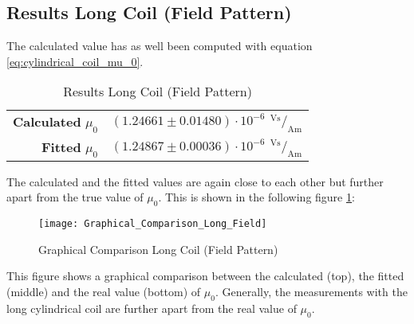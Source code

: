 \subsection{Results Long Coil (Field Pattern)}
\label{subsec:Results_Long_Coil_Field}
The calculated value has as well been computed with equation \ref{eq:cylindrical_coil_mu_0}.
\begin{table}[H]
	\centering
	\renewcommand{\arraystretch}{1.3}
	\begin{tabular}{r l}
		\hline
		\textbf{Calculated} $\mu_0$ & $(1.24661\pm0.01480)\cdot10^{-6}\ \,^\text{Vs}\!/_\text{Am}$ \\
		\textbf{Fitted} $\mu_0$ & $(1.24867\pm0.00036)\cdot10^{-6}\ \,^\text{Vs}\!/_\text{Am}$ \\ \hline
	\end{tabular}
	\caption{Results Long Coil (Field Pattern)}
	\label{tab:Results_Long_Coil_Field}
\end{table}
The calculated and the fitted values are again close to each other but further apart from the true value of $\mu_0$. This is shown in the following figure \ref{fig:Graphical_Comparison_Long_Field}:
\begin{figure}[H]
	\centering
	\texttt{[image: Graphical\_Comparison\_Long\_Field]}
	\caption{Graphical Comparison Long Coil (Field Pattern)}
	\label{fig:Graphical_Comparison_Long_Field}
\end{figure}
This figure shows a graphical comparison between the calculated (top), the fitted (middle) and the real value (bottom) of $\mu_0$. Generally, the measurements with the long cylindrical coil are further apart from the real value of $\mu_0$.
